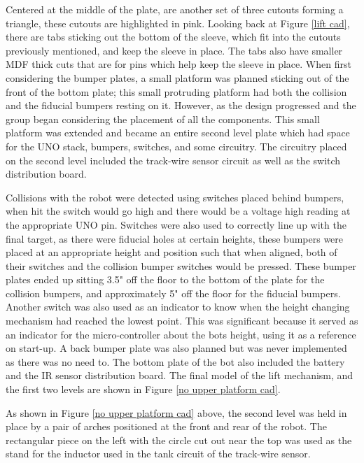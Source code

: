 \documentclass[]{article}
\begin{document}
Centered at the middle of the plate, are another set of three cutouts forming a triangle, these cutouts are highlighted in pink. Looking back at Figure \ref{lift cad}, there are tabs sticking out the bottom of the sleeve, which fit into the cutouts previously mentioned, and keep the sleeve in place. The tabs also have smaller MDF thick cuts that are for pins which help keep the sleeve in place. 
When first considering the bumper plates, a small platform was planned sticking out of the front of the bottom plate; this small protruding platform had both the collision and the fiducial bumpers resting on it. However, as the design progressed and the group began considering the placement of all the components. This small platform was extended and became an entire second level plate which had space for the UNO stack, bumpers, switches, and some circuitry. The circuitry placed on the second level included the track-wire sensor circuit as well as the switch distribution board. 

Collisions with the robot were detected using switches placed behind bumpers, when hit the switch would go high and there would be a voltage high reading at the appropriate UNO pin. Switches were also used to correctly line up with the final target, as there were fiducial holes at certain heights, these bumpers were placed at an appropriate height and position such that when aligned, both of their switches and the collision bumper switches would be pressed. These bumper plates ended up sitting 3.5" off the floor to the bottom of the plate for the collision bumpers, and approximately 5" off the floor for the fiducial bumpers. Another switch was also used as an indicator to know when the height changing mechanism had reached the lowest point. This was significant because it served as an indicator for the micro-controller about the bots height, using it as a reference on start-up. A back bumper plate was also planned but was never implemented as there was no need to. The bottom plate of the bot also included the battery and the IR sensor distribution board. The final model of the lift mechanism, and the first two levels are shown in Figure \ref{no upper platform cad}. 

As shown in Figure \ref{no upper platform cad} above, the second level was held in place by a pair of arches positioned at the front and rear of the robot. The rectangular piece on the left with the circle cut out near the top was used as the stand for the inductor used in the tank circuit of the track-wire sensor. 
\end{document}
